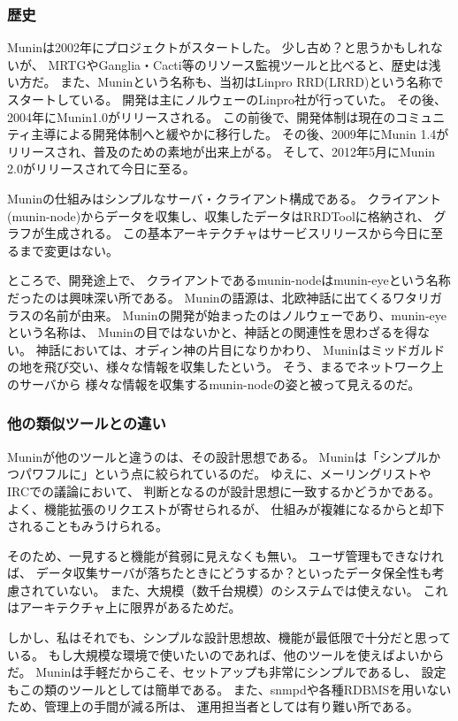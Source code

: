 \subsubsection{歴史}
Muninは2002年にプロジェクトがスタートした。
少し古め？と思うかもしれないが、
MRTGやGanglia・Cacti等のリソース監視ツールと比べると、歴史は浅い方だ。
また、Muninという名称も、当初はLinpro RRD(LRRD)という名称でスタートしている。
開発は主にノルウェーのLinpro社が行っていた。
その後、2004年にMunin1.0がリリースされる。
この前後で、開発体制は現在のコミュニティ主導による開発体制へと緩やかに移行した。
その後、2009年にMunin 1.4がリリースされ、普及のための素地が出来上がる。
そして、2012年5月にMunin 2.0がリリースされて今日に至る。

Muninの仕組みはシンプルなサーバ・クライアント構成である。
クライアント(munin-node)からデータを収集し、収集したデータはRRDToolに格納され、
グラフが生成される。
この基本アーキテクチャはサービスリリースから今日に至るまで変更はない。

ところで、開発途上で、
クライアントであるmunin-nodeはmunin-eyeという名称だったのは興味深い所である。
Muninの語源は、北欧神話に出てくるワタリガラスの名前が由来。
Muninの開発が始まったのはノルウェーであり、munin-eyeという名称は、
Muninの目ではないかと、神話との関連性を思わざるを得ない。
神話においては、オディン神の片目になりかわり、
Muninはミッドガルドの地を飛び交い、様々な情報を収集したという。
そう、まるでネットワーク上のサーバから
様々な情報を収集するmunin-nodeの姿と被って見えるのだ。

\subsubsection{他の類似ツールとの違い}
Muninが他のツールと違うのは、その設計思想である。
Muninは「シンプルかつパワフルに」という点に絞られているのだ。
ゆえに、メーリングリストやIRCでの議論において、
判断となるのが設計思想に一致するかどうかである。
よく、機能拡張のリクエストが寄せられるが、
仕組みが複雑になるからと却下されることもみうけられる。

そのため、一見すると機能が貧弱に見えなくも無い。
ユーザ管理もできなければ、
データ収集サーバが落ちたときにどうするか？といったデータ保全性も考慮されていない。
また、大規模（数千台規模）のシステムでは使えない。
これはアーキテクチャ上に限界があるためだ。

しかし、私はそれでも、シンプルな設計思想故、機能が最低限で十分だと思っている。
もし大規模な環境で使いたいのであれば、他のツールを使えばよいからだ。
Muninは手軽だからこそ、セットアップも非常にシンプルであるし、
設定もこの類のツールとしては簡単である。
また、snmpdや各種RDBMSを用いないため、管理上の手間が減る所は、
運用担当者としては有り難い所である。

